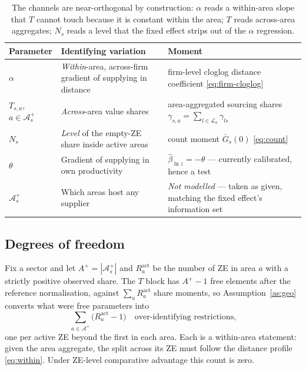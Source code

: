 \documentclass[11pt]{article}
\newcommand{\Areas}{\mathcal{A}}
\begin{document}
\begin{table}[htbp]
\centering
\small
\begin{tabular}{@{}llp{}@{}}
\toprule
\textbf{Parameter} & \textbf{Identifying variation} & \textbf{Moment}\\
\midrule
$\alpha$ & \emph{Within}-area, across-firm gradient of supplying in distance
& firm-level cloglog distance coefficient \eqref{eq:firm-cloglog}\\
$T_{s,a}$, $a\in\Areas^{+}_{s}$ & \emph{Across}-area value shares
& area-aggregated sourcing shares $\gamma_{s,a}=\sum_{l\in\mathcal{L}_{a}}\gamma_{ls}$\\
$N_{s}$ & \emph{Level} of the empty-ZE share inside active areas
& count moment $\bar G_{s}(0)$ \eqref{eq:count}\\
$\theta$ & Gradient of supplying in own productivity
& $\hat\beta_{\ln z}=-\theta$ --- currently calibrated, hence a test\\
$\Areas^{+}_{s}$ & Which areas host any supplier
& \emph{Not modelled} --- taken as given, matching the fixed effect's information set\\
\bottomrule
\end{tabular}
\caption{The channels are near-orthogonal by construction: $\alpha$ reads a within-area slope that
$T$ cannot touch because it is constant within the area; $T$ reads across-area aggregates;
$N_{s}$ reads a level that the fixed effect strips out of the $\alpha$ regression.}
\label{tab:identification}
\end{table}

\subsection{Degrees of freedom}

Fix a sector and let $A^{+}=|\Areas^{+}_{s}|$ and $R^{\mathrm{act}}_{a}$ be the number of ZE in
area $a$ with a strictly positive observed share. The $T$ block has $A^{+}-1$ free elements after
the reference normalisation, against $\sum_{a}R^{\mathrm{act}}_{a}$ share moments, so
Assumption~\ref{as:geo} converts what were free parameters into
\begin{equation}
\sum_{a\in\Areas^{+}}\big(R^{\mathrm{act}}_{a}-1\big)
\quad\text{over-identifying restrictions,}
\end{equation}
one per active ZE beyond the first in each area. Each is a within-area statement: given the area
aggregate, the split across its ZE must follow the distance profile \eqref{eq:within}. Under
ZE-level comparative advantage this count is zero.
\end{document}
